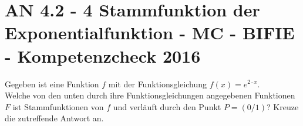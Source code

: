 \section{AN 4.2 - 4 Stammfunktion der Exponentialfunktion - MC - BIFIE - Kompetenzcheck 2016}

\begin{beispiel}[AN 4.2]{1} %
				Gegeben ist eine Funktion $f$ mit der Funktionsgleichung $f(x)=e^{2\cdot x}$.\\
				
				Welche von den unten durch ihre Funktionsgleichungen angegebenen Funktionen $F$ ist Stammfunktionen von $f$ und verläuft durch den Punkt $P=(0/1)$?
				Kreuze die zutreffende Antwort an.\\
				
\end{beispiel}	